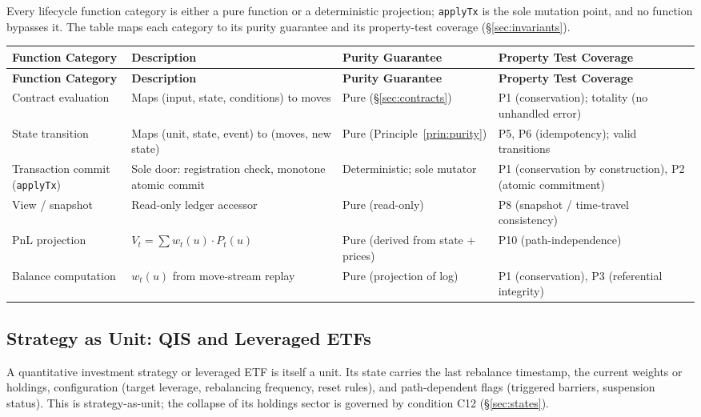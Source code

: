 \documentclass[11pt,a4paper]{article}
\begin{document}
Every lifecycle function category is either a pure function or a deterministic projection; \texttt{applyTx} is the sole mutation point, and no function bypasses it. The table maps each category to its purity guarantee and its property-test coverage (\S\ref{sec:invariants}).

\begin{center}
\begin{longtable}{p{3.2cm} p{4cm} p{2.8cm} p{3.5cm}}
\toprule
\textbf{Function Category} & \textbf{Description} & \textbf{Purity Guarantee} & \textbf{Property Test Coverage} \\
\midrule
\endfirsthead
\toprule
\textbf{Function Category} & \textbf{Description} & \textbf{Purity Guarantee} & \textbf{Property Test Coverage} \\
\midrule
\endhead
Contract evaluation & Maps (input, state, conditions) to moves & Pure (\S\ref{sec:contracts}) & P1 (conservation); totality (no unhandled error) \\
\midrule
State transition & Maps (unit, state, event) to (moves, new state) & Pure (Principle~\ref{prin:purity}) & P5, P6 (idempotency); valid transitions \\
\midrule
Transaction commit (\texttt{applyTx}) & Sole door: registration check, monotone atomic commit & Deterministic; sole mutator & P1 (conservation by construction), P2 (atomic commitment) \\
\midrule
View / snapshot & Read-only ledger accessor & Pure (read-only) & P8 (snapshot / time-travel consistency) \\
\midrule
PnL projection & $V_t = \sum w_t(u) \cdot P_t(u)$ & Pure (derived from state + prices) & P10 (path-independence) \\
\midrule
Balance computation & $w_t(u)$ from move-stream replay & Pure (projection of log) & P1 (conservation), P3 (referential integrity) \\
\bottomrule
\end{longtable}
\end{center}

\subsection{Strategy as Unit: QIS and Leveraged ETFs}

A quantitative investment strategy or leveraged ETF is itself a unit. Its state carries the last rebalance timestamp, the current weights or holdings, configuration (target leverage, rebalancing frequency, reset rules), and path-dependent flags (triggered barriers, suspension status). This is strategy-as-unit; the collapse of its holdings sector is governed by condition C12 (\S\ref{sec:states}).
\end{document}
